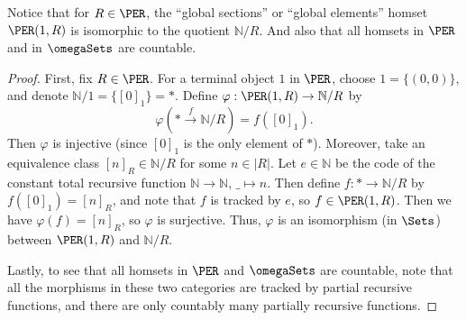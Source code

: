 \begin{exercise}
Notice that for \(R \in \PER\), the ``global sections'' or ``global elements'' homset \(\PER(1, R)\) is isomorphic to the quotient \(\mathbb{N} / R\).
And also that all homsets in \(\PER\) and in \(\omegaSets\) are countable.
\end{exercise}

\begin{proof}
First, fix \(R \in \PER\). For a terminal object \(1\) in \(\PER\), choose \(1 = \{(0, 0)\}\), and denote \(\mathbb{N} / 1 = \{[0]_1\} = *\).
Define \(\varphi : \PER(1, R) \to \mathbb{N} / R\) by
\begin{equation*}
\varphi\left(* \xrightarrow{f} \mathbb{N} / R\right)
= f([0]_1).
\end{equation*}
Then \(\varphi\) is injective (since \([0]_1\) is the only element of \(*\)).
Moreover, take an equivalence class \([n]_R \in \mathbb{N} / R\) for some \(n \in |R|\).
Let \(e \in \mathbb{N}\) be the code of the constant total recursive function \(\mathbb{N} \to \mathbb{N}\), \(\_ \mapsto n\).
Then define \(f : * \to \mathbb{N} / R\) by \(f([0]_1) = [n]_R\), and note that \(f\) is tracked by \(e\), so \(f \in \PER(1, R)\).
Then we have \(\varphi(f) = [n]_R\), so \(\varphi\) is surjective.
Thus, \(\varphi\) is an isomorphism (in \(\Sets\)) between \(\PER(1, R)\) and \(\mathbb{N} / R\).

Lastly, to see that all homsets in \(\PER\) and \(\omegaSets\) are countable, note that all the morphisms in these two categories are tracked by partial recursive functions, and there are only countably many partially recursive functions.
\end{proof}